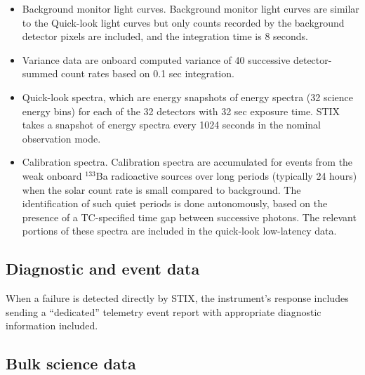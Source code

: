 \documentclass{aa}
\begin{document}
\begin{itemize}
\item Background monitor light curves. Background monitor light curves are similar to the Quick-look light curves but only
counts recorded by the background detector pixels are included, and the integration time is 8 seconds.
\item Variance data are   onboard computed variance of 40 successive detector-summed count rates
based on 0.1 sec integration.
\item Quick-look spectra, which are energy snapshots of energy spectra (32 science energy bins) for
each of the 32 detectors with 32 sec exposure time.
STIX takes a snapshot of energy spectra every 1024
seconds in the nominal observation mode.
\item Calibration spectra. Calibration spectra are accumulated for events from the weak onboard $^{133}$Ba radioactive sources over long periods (typically 24 hours) when the solar count rate is small compared to background.
The identification of such quiet periods is done autonomously, based on the presence of a
TC-specified time gap between successive photons.  The relevant portions of these
spectra are included in the quick-look low-latency data.
\end{itemize}
\subsection{Diagnostic and event data}
When a failure is detected directly by STIX, the instrument’s response includes sending a
“dedicated” telemetry event report with appropriate diagnostic information included.

\subsection{Bulk science data}
\end{document}
